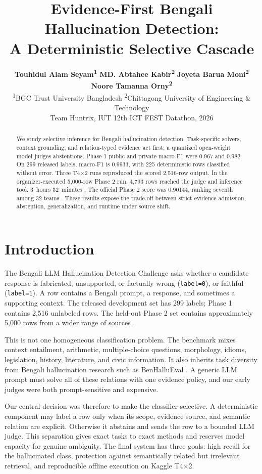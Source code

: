 \documentclass[11pt]{article}
\title{Evidence-First Bengali Hallucination Detection:\\
A Deterministic Selective Cascade}
\author{
  \textbf{Touhidul Alam Seyam\textsuperscript{1}} \quad
  \textbf{MD. Abtahee Kabir\textsuperscript{2}} \quad
  \textbf{Joyeta Barua Moni\textsuperscript{2}} \\
  \textbf{Noore Tamanna Orny\textsuperscript{2}} \\
  \textsuperscript{1}BGC Trust University Bangladesh \quad
  \textsuperscript{2}Chittagong University of Engineering \& Technology \\
  Team Huntrix, IUT 12th ICT FEST Datathon, 2026
}
\newcommand{\labelzero}{\texttt{label=0}}
\newcommand{\labelone}{\texttt{label=1}}
\begin{document}
\maketitle

\begin{abstract}
We study selective inference for Bengali hallucination detection. Task-specific solvers, context grounding, and relation-typed evidence act first; a quantized open-weight model judges abstentions. Phase 1 public and private macro-F1 were 0.967 and 0.982. On 299 released labels, macro-F1 is 0.9933, with 225 deterministic rows classified without error. Three T4$\times$2 runs reproduced the scored 2,516-row output. In the organizer-executed 5,000-row Phase 2 run, 4,793 rows reached the judge and inference took 3~hours 52~minutes \citep{phase2run}. The official Phase 2 score was 0.90144, ranking seventh among 32 teams \citep{phase2results}. These results expose the trade-off between strict evidence admission, abstention, generalization, and runtime under source shift.
\end{abstract}

\section{Introduction}

The Bengali LLM Hallucination Detection Challenge asks whether a candidate response is fabricated, unsupported, or factually wrong (\labelzero), or faithful (\labelone). A row contains a Bengali prompt, a response, and sometimes a supporting context. The released development set has 299 labels; Phase 1 contains 2,516 unlabeled rows. The held-out Phase 2 set contains approximately 5,000 rows from a wider range of sources \citep{competition,phase2}.

This is not one homogeneous classification problem. The benchmark mixes context entailment, arithmetic, multiple-choice questions, morphology, idioms, legislation, history, literature, and civic information. It also inherits task diversity from Bengali hallucination research such as BenHalluEval \citep{benhallu}. A generic LLM prompt must solve all of these relations with one evidence policy, and our early judges were both prompt-sensitive and expensive.

Our central decision was therefore to make the classifier selective. A deterministic component may label a row only when its scope, evidence source, and semantic relation are explicit. Otherwise it abstains and sends the row to a bounded LLM judge. This separation gives exact tasks to exact methods and reserves model capacity for genuine ambiguity. The final system has three goals: high recall for the hallucinated class, protection against semantically related but irrelevant retrieval, and reproducible offline execution on Kaggle T4$\times$2.
\end{document}
